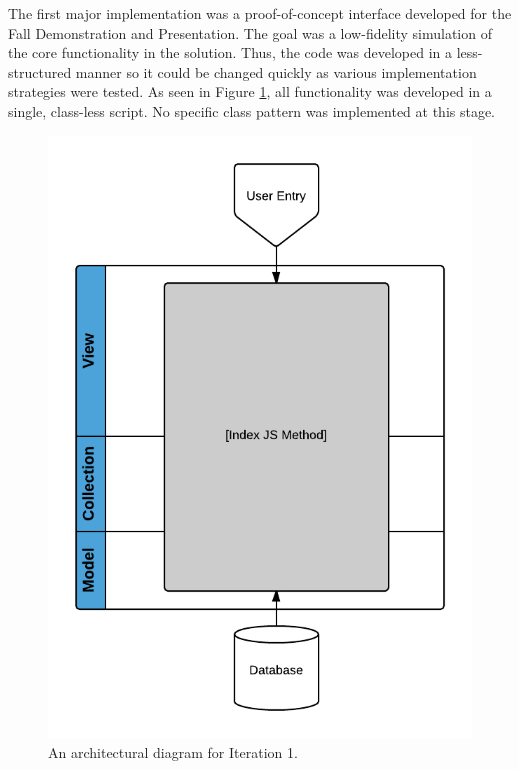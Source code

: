 \documentclass{report}
\begin{document}
The first major implementation was a proof-of-concept interface developed for the Fall Demonstration and Presentation. The goal was a low-fidelity simulation of the core functionality in the solution. Thus, the code was developed in a less-structured manner so it could be changed quickly as various implementation strategies were tested. As seen in Figure \ref{fig:iteration1}, all functionality was developed in a single, class-less script. No specific class pattern was implemented at this stage.

\begin{figure}[htbp!]
  \begin{centering}
    \includegraphics[scale=0.25]{figures/Iteration-1.png}
    \caption{An architectural diagram for Iteration 1.}
    \label{fig:iteration1}
  \end{centering}
\end{figure}
\end{document}
